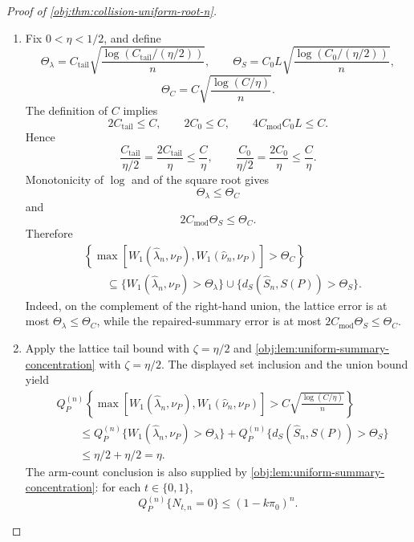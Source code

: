 \documentclass[11pt]{article}
\begin{document}
\begin{proof}[Proof of \cref{obj:thm:collision-uniform-root-n}]
\begin{enumerate}
\item Fix \(0<\eta<1/2\), and define
\[
\Theta_\lambda
=
C_{\mathrm{tail}}
\sqrt{\frac{\log(C_{\mathrm{tail}}/(\eta/2))}{n}},
\qquad
\Theta_S
=
C_0L
\sqrt{\frac{\log(C_0/(\eta/2))}{n}},
\]
\[
\Theta_C
=
C\sqrt{\frac{\log(C/\eta)}{n}} .
\]
The definition of \(C\) implies
\[
2C_{\mathrm{tail}}\le C,
\qquad
2C_0\le C,
\qquad
4C_{\mathrm{mod}}C_0L\le C .
\]
Hence
\[
\frac{C_{\mathrm{tail}}}{\eta/2}
=
\frac{2C_{\mathrm{tail}}}{\eta}
\le
\frac{C}{\eta},
\qquad
\frac{C_0}{\eta/2}
=
\frac{2C_0}{\eta}
\le
\frac{C}{\eta}.
\]
Monotonicity of \(\log\) and of the square root gives
\[
\Theta_\lambda\le\Theta_C
\]
and
\[
2C_{\mathrm{mod}}\Theta_S\le\Theta_C .
\]
Therefore
\[
\begin{aligned}
&\left\{
\max\!\left[
W_1(\widehat\lambda_n,\nu_P),
W_1(\widehat\nu_n,\nu_P)
\right]>\Theta_C
\right\}  \\
&\qquad\subseteq
\{W_1(\widehat\lambda_n,\nu_P)>\Theta_\lambda\}
\cup
\{d_S(\widehat S_n,S(P))>\Theta_S\}.
\end{aligned}
\]
Indeed, on the complement of the right-hand union, the lattice error is at most
\(\Theta_\lambda\le\Theta_C\), while the repaired-summary error is at most
\(2C_{\mathrm{mod}}\Theta_S\le\Theta_C\).%

\item Apply the lattice tail bound with \(\zeta=\eta/2\) and
\cref{obj:lem:uniform-summary-concentration} with \(\zeta=\eta/2\).  The
displayed set inclusion and the union bound yield
\[
\begin{aligned}
&Q_P^{(n)}
\left\{
\max\!\left[
W_1(\widehat\lambda_n,\nu_P),
W_1(\widehat\nu_n,\nu_P)
\right]>
C\sqrt{\frac{\log(C/\eta)}{n}}
\right\} \\
&\qquad\le
Q_P^{(n)}\{W_1(\widehat\lambda_n,\nu_P)>\Theta_\lambda\}
+
Q_P^{(n)}\{d_S(\widehat S_n,S(P))>\Theta_S\} \\
&\qquad\le
\eta/2+\eta/2
=\eta .
\end{aligned}
\]
The arm-count conclusion is also supplied by
\cref{obj:lem:uniform-summary-concentration}: for each
\(t\in\{0,1\}\),
\[
Q_P^{(n)}\{N_{t,n}=0\}\le (1-k\pi_0)^n .
\]%
\end{enumerate}
\end{proof}
\end{document}
